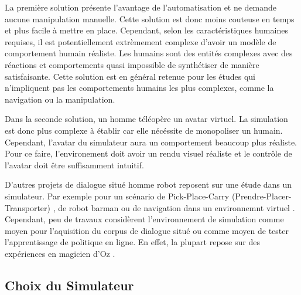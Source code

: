 \documentclass[a4paper,11pt,twoside]{StyleThese}
\begin{document}
La première solution présente l'avantage de l'automatisation et ne demande aucune manipulation manuelle. Cette solution est donc moins couteuse en temps et plus facile à mettre en place. Cependant, selon les caractéristiques humaines requises, il est potentiellement extrèmement complexe d'avoir un modèle de comportement humain réaliste. Les humains sont des entités complexes avec des réactions et comportements quasi impossible de synthétiser de manière satisfaisante. Cette solution est en général retenue pour les études qui n'impliquent pas les comportements humains les plus complexes, comme la navigation ou la manipulation.

Dans la seconde solution, un homme téléopère un avatar virtuel. La simulation est donc plus complexe à établir car elle nécéssite de monopoliser un humain. Cependant, l'avatar du simulateur aura un comportement beaucoup plus réaliste. Pour ce faire, l'environement doit avoir un rendu visuel réaliste et le contrôle de l'avatar doit être suffisamment intuitif.

D'autres projets de dialogue situé homme robot reposent sur une étude dans un simulateur. Par exemple pour un scénario de Pick-Place-Carry (Prendre-Placer-Transporter) \cite{Lucignano13}, de robot barman \cite{stiefelhagen07} ou de navigation dans un environnemnt virtuel \cite{byron-fosler-lrec:06}. Cependant, peu de travaux considèrent l'environnement de simulation comme moyen pour l'aquisition du corpus de dialogue situé ou comme moyen de tester l'apprentissage de politique en ligne.
%
En effet, la plupart repose sur des expériences en magicien d'Oz \cite{prommer06,stiefelhagen07,rieser08}. 



\subsection{Choix du Simulateur}
\end{document}
